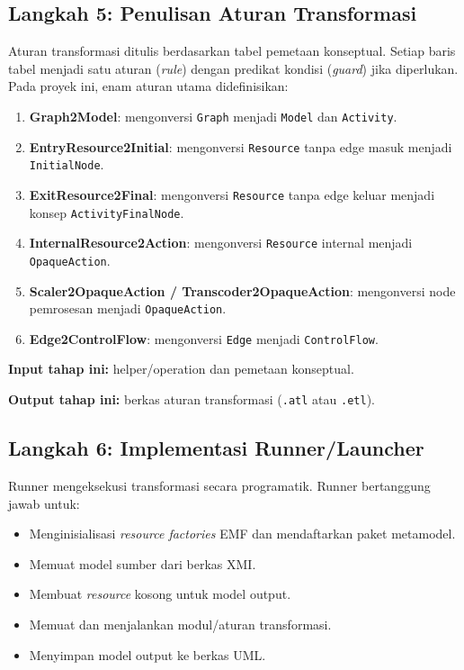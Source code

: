 \subsection{Langkah 5: Penulisan Aturan Transformasi}

Aturan transformasi ditulis berdasarkan tabel pemetaan konseptual. Setiap baris tabel menjadi satu aturan (\textit{rule}) dengan predikat kondisi (\textit{guard}) jika diperlukan. Pada proyek ini, enam aturan utama didefinisikan:
\begin{enumerate}
  \item \textbf{Graph2Model}: mengonversi \texttt{Graph} menjadi \texttt{Model} dan \texttt{Activity}.
  \item \textbf{EntryResource2Initial}: mengonversi \texttt{Resource} tanpa edge masuk menjadi \texttt{InitialNode}.
  \item \textbf{ExitResource2Final}: mengonversi \texttt{Resource} tanpa edge keluar menjadi konsep \texttt{ActivityFinalNode}.
  \item \textbf{InternalResource2Action}: mengonversi \texttt{Resource} internal menjadi \texttt{OpaqueAction}.
  \item \textbf{Scaler2OpaqueAction / Transcoder2OpaqueAction}: mengonversi node pemrosesan menjadi \texttt{OpaqueAction}.
  \item \textbf{Edge2ControlFlow}: mengonversi \texttt{Edge} menjadi \texttt{ControlFlow}.
\end{enumerate}

\textbf{Input tahap ini:} helper/operation dan pemetaan konseptual.

\textbf{Output tahap ini:} berkas aturan transformasi (\texttt{.atl} atau \texttt{.etl}).

\subsection{Langkah 6: Implementasi Runner/Launcher}

Runner mengeksekusi transformasi secara programatik. Runner bertanggung jawab untuk:
\begin{itemize}
  \item Menginisialisasi \textit{resource factories} EMF dan mendaftarkan paket metamodel.
  \item Memuat model sumber dari berkas XMI.
  \item Membuat \textit{resource} kosong untuk model output.
  \item Memuat dan menjalankan modul/aturan transformasi.
  \item Menyimpan model output ke berkas UML.
\end{itemize}

